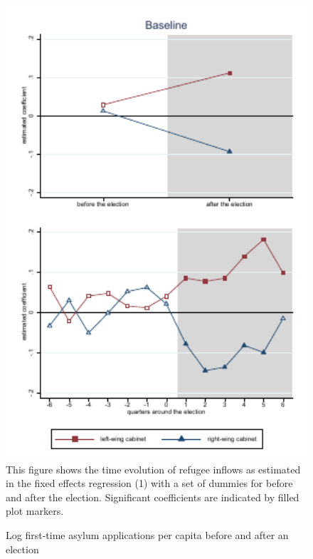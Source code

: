 \documentclass[a4paper,12pt]{article}
\begin{document}
 \begin{figure}
	\centering
    	\caption{Log first-time asylum applications per capita before and after an election}
	\includegraphics[width=1\textwidth]{inputs/app_graphs_baseline.pdf}
    {\footnotesize This figure shows the time evolution of refugee inflows as estimated in the fixed effects regression (1) with a set of dummies for before and after the election. Significant coefficients are indicated by filled plot markers.}
	\label{main_results_bef-after}
\end{figure}
\end{document}
